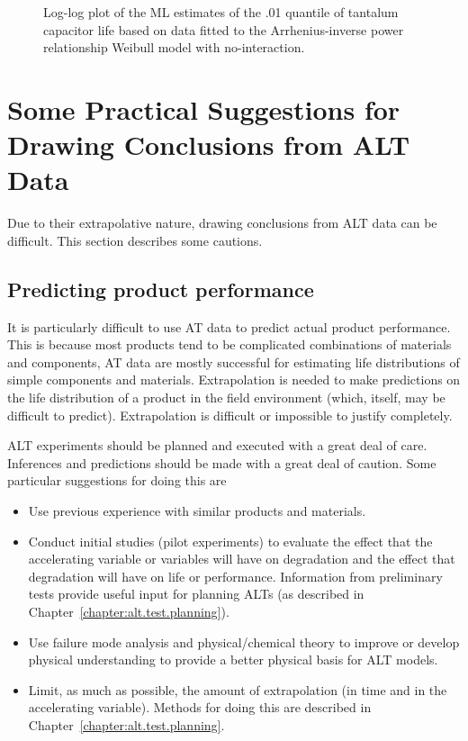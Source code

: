\begin{figure}
\caption{Log-log plot of the ML estimates of the
.01 quantile of tantalum capacitor life
based on data fitted to the 
Arrhenius-inverse power relationship Weibull model with no-interaction.}
\label{figure:tantalum.cellquan.ps}
\end{figure}

\section{Some Practical Suggestions for Drawing Conclusions
from ALT Data}
\label{section:practical.suggest.alt}

Due to their extrapolative nature,
drawing conclusions from ALT data can be difficult.
This section describes some cautions.

\subsection{Predicting product performance}

It is particularly difficult to use AT data to predict actual product
performance.  This is because most products tend to be complicated
combinations of materials and components, AT data are mostly
successful for estimating life distributions of simple components and
materials.  Extrapolation is needed to make predictions on the life
distribution of a product in the field environment (which, itself, may
be difficult to predict).  Extrapolation is difficult or impossible to
justify completely.

ALT experiments should be planned and executed with a great deal of
care.  Inferences and predictions should be made with a great deal of
caution.  Some particular suggestions for doing this are
\begin{itemize}
\item
Use previous experience with similar products and materials.
\item
Conduct initial studies (pilot experiments) to evaluate the effect
that the accelerating variable or variables will have on degradation and
the effect that degradation will have on life or performance.
Information from preliminary tests provide useful input for planning
ALTs (as described in Chapter~\ref{chapter:alt.test.planning}).
\item
Use failure mode analysis and physical/chemical theory to improve or
develop physical understanding to provide a better physical basis for
ALT models.
\item
Limit, as much as possible, the amount of extrapolation (in time and
in the accelerating variable). Methods for doing this are described in
Chapter~\ref{chapter:alt.test.planning}.

\end{itemize}

